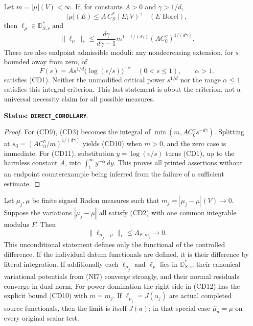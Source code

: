 \begin{corollary}
\label{cor:r12-power-capacity-dual-data}
Let $m=|\mu|(V)<\infty$. If, for constants $A>0$ and
$\gamma>1/d$,
\[
                 |\mu|(E)\leq A\,C_S^*(E;V)^\gamma
                    \quad(E\text{ Borel}),
 \tag{CD9}
\]
then $\ell_\mu\in\mathbb D_{S,\mathrm s}^*$ and
\[
 \|\ell_\mu\|_*
 \leq \frac{d\gamma}{d\gamma-1}
       m^{1-1/(d\gamma)}
                  (A C_0^\gamma)^{1/(d\gamma)}.
 \tag{CD10}
\]
There are also endpoint admissible moduli: any nondecreasing
extension, for $s$ bounded away from zero, of
\[
             F(s)=A s^{1/d}\bigl(\log(e/s)\bigr)^{-\alpha}
                   \quad(0<s\leq1),\qquad \alpha>1,
 \tag{CD11}
\]
satisfies (CD1). Neither the unmodified critical power
$s^{1/d}$ nor the range $\alpha\leq1$ satisfies this
integral criterion. This last statement is about the criterion,
not a universal necessity claim for all possible measures.
\end{corollary}

\noindent\textbf{Status: \texttt{DIRECT\_COROLLARY}}.

\begin{proof}
For (CD9), (CD3) becomes the integral of
$\min(m,A C_0^\gamma s^{-d\gamma})$. Splitting at
$s_0=(A C_0^\gamma/m)^{1/(d\gamma)}$ yields (CD10) when
$m>0$, and the zero case is immediate. For (CD11), substitution
$y=\log(e/s)$ turns (CD1), up to the harmless constant $A$,
into $\int_1^\infty y^{-\alpha}\,dy$. This proves all printed
assertions without an endpoint counterexample being inferred
from the failure of a sufficient estimate.
\end{proof}

\begin{proposition}
\label{prop:r12-capacity-dini-data-stability}
Let $\mu_j,\mu$ be finite signed Radon measures such that
$m_j=|\mu_j-\mu|(V)\to0$. Suppose the variations
$|\mu_j-\mu|$ all satisfy (CD2) with one common integrable
modulus $F$. Then
\[
         \|\ell_{\mu_j-\mu}\|_*
                \leq A_{F,m_j}\longrightarrow0.
 \tag{CD12}
\]
This unconditional statement defines only the functional of the
controlled difference. If the individual datum functionals are
defined, it is their difference by literal integration.
If additionally each $\ell_{\mu_j}$ and $\ell_\mu$ lies in
$\mathbb D_{S,\mathrm s}^*$, their canonical variational
potentials from (NI7) converge strongly, and their normal
residuals converge in dual norm. For power domination the
right side in (CD12) has the explicit bound (CD10) with
$m=m_j$. If $\ell_{\mu_j}=J(u_j)$ are actual completed source
functionals, then the limit is itself $J(u)$; in that special
case $\widehat\mu_u=\mu$ on every original scalar test.
\end{proposition}

